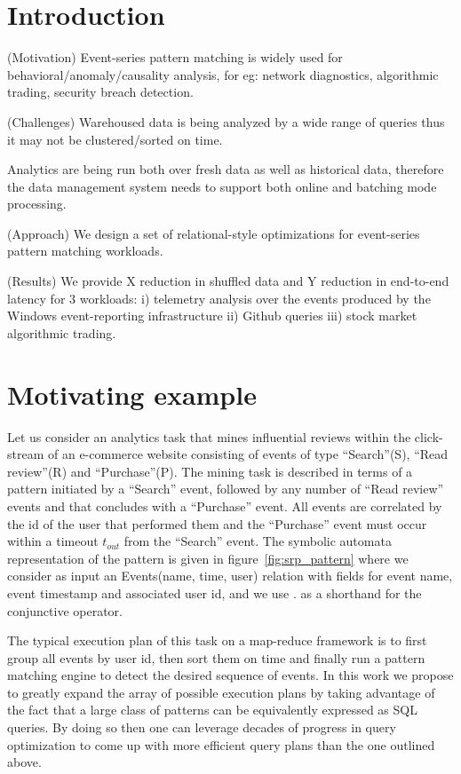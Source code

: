 \section{Introduction}

(Motivation) 
Event-series pattern matching is widely used for behavioral/anomaly/causality
analysis, for eg: network diagnostics, algorithmic
trading, security breach detection.


(Challenges)
Warehoused data is being analyzed by a wide range of queries thus it
may not be clustered/sorted on time. 

Analytics are being run both over fresh data as well as historical data,
therefore the data management system needs to support both online and
batching mode processing.


(Approach)
We design a set of relational-style optimizations for event-series pattern
matching workloads.

(Results)
We provide X reduction in shuffled data and Y reduction in end-to-end latency
for 3 workloads:
i) telemetry analysis over the events produced by the Windows event-reporting
infrastructure
ii) Github queries
iii) stock market algorithmic trading.




\section{Motivating example}

Let us consider an analytics task that mines influential reviews
within the click-stream of an e-commerce website consisting of events of type
``Search''(S), ``Read review''(R) and ``Purchase''(P).
The mining task is described in terms of a pattern initiated by a ``Search''
event, followed by any number of ``Read review'' events and that concludes with
a ``Purchase'' event. 
All events are correlated by the id of the user that performed them and the
``Purchase'' event must occur within a timeout $t_{out}$ from the ``Search'' event. 
The symbolic automata representation of the pattern is given in
figure~\ref{fig:srp_pattern} where we consider as input an Events(name, time,
user) relation with fields for event name, event timestamp and
associated user id, and we use $.$ as a shorthand for the conjunctive operator.

The typical execution plan of this task on a map-reduce framework is to first
group all events by user id, then sort them on time and finally run a pattern
matching engine to detect the desired sequence of events.
In this work we propose to greatly expand the array of possible execution plans
by taking advantage of the fact that a large class of patterns can be
equivalently expressed as SQL queries.
By doing so then one can leverage decades of progress in query optimization to
come up with more efficient query plans than the one outlined above.

